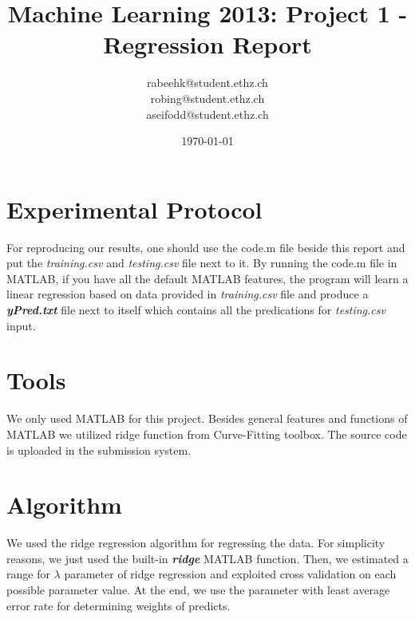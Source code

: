 \documentclass[a4paper, 11pt]{article}
\title{Machine Learning 2013: Project 1 - Regression Report}
\author{rabeehk@student.ethz.ch\\ robing@student.ethz.ch\\ aseifodd@student.ethz.ch\\ }
\date{\today}
\begin{document}
\maketitle

\section*{Experimental Protocol}
For reproducing our results, one should use the code.m file beside this report and put the \textit{training.csv} and \textit{testing.csv} file next to it. By running the code.m file in MATLAB, if you have all the default MATLAB features, the program will learn a linear regression based on data provided in \textit{training.csv} file and produce a \textbf{\textit{yPred.txt}} file next to itself which contains all the predications for \textit{testing.csv} input.

\section{Tools}
We only used MATLAB for this project. Besides general features and functions of MATLAB we utilized ridge function from Curve-Fitting toolbox. The source code is uploaded in the submission system.

\section{Algorithm}
We used the ridge regression algorithm for regressing the data. For simplicity reasons, we just used the built-in \textbf{\textit{ridge}} MATLAB function. Then, we estimated a range for $\lambda$ parameter of ridge regression and exploited cross validation on each possible parameter value. At the end, we use the parameter with least average error rate for determining weights of predicts.
\end{document}
